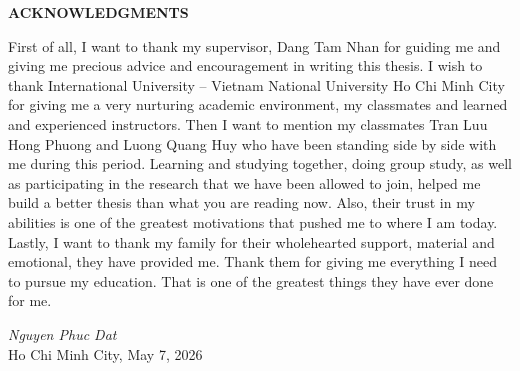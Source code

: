 \documentclass[12pt,a4paper]{article}
\begin{document}

\newpage
\thispagestyle{empty}
\begin{center}
  \textbf{ACKNOWLEDGMENTS}
\end{center}

\vspace{1cm}

First of all, I want to thank my supervisor, Dang Tam Nhan for guiding me and giving me precious advice and encouragement in writing this thesis.
I wish to thank International University – Vietnam National University Ho Chi Minh City for giving me a very nurturing academic environment, my classmates and learned and experienced instructors.
Then I want to mention my classmates Tran Luu Hong Phuong and Luong Quang Huy who have been standing side by side with me during this period. Learning and studying together, doing group study, as well as participating in the research that we have been allowed to join, helped me build a better thesis than what you are reading now. Also, their trust in my abilities is one of the greatest motivations that pushed me to where I am today.
Lastly, I want to thank my family for their wholehearted support, material and emotional, they have provided me. Thank them for giving me everything I need to pursue my education. That is one of the greatest things they have ever done for me.

\vspace{0.6cm}

\enlargethispage{2\baselineskip}

\begin{flushright}
\begin{minipage}{0.45\linewidth}
  \raggedleft
  \singlespacing
  \textit{Nguyen Phuc Dat}\\[0.25cm]
  Ho Chi Minh City, May 7, 2026
\end{minipage}
\end{flushright}


\newpage
\tableofcontents

\newpage
\listoftables

\newpage
\listoffigures
\end{document}
